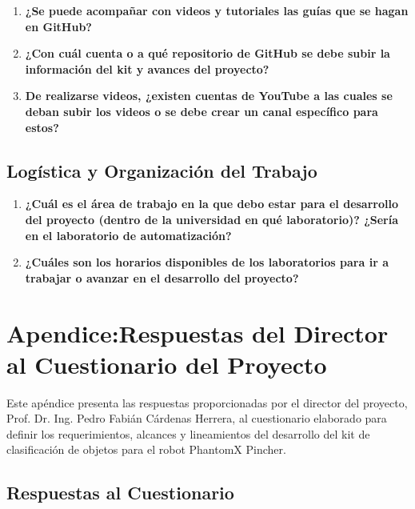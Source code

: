 \begin{enumerate}[start=15]
    \item \textbf{¿Se puede acompañar con videos y tutoriales las guías que se hagan en GitHub?}
    
    \item \textbf{¿Con cuál cuenta o a qué repositorio de GitHub se debe subir la información del kit y avances del proyecto?}
    
    \item \textbf{De realizarse videos, ¿existen cuentas de YouTube a las cuales se deban subir los videos o se debe crear un canal específico para estos?}
\end{enumerate}

\section{Logística y Organización del Trabajo}

\begin{enumerate}[start=24]
    \item \textbf{¿Cuál es el área de trabajo en la que debo estar para el desarrollo del proyecto (dentro de la universidad en qué laboratorio)? ¿Sería en el laboratorio de automatización?}
    
    \item \textbf{¿Cuáles son los horarios disponibles de los laboratorios para ir a trabajar o avanzar en el desarrollo del proyecto?}
\end{enumerate}


\chapter{Apendice:Respuestas del Director al Cuestionario del Proyecto}

Este apéndice presenta las respuestas proporcionadas por el director del proyecto, Prof. Dr. Ing. Pedro Fabián Cárdenas Herrera, al cuestionario elaborado para definir los requerimientos, alcances y lineamientos del desarrollo del kit de clasificación de objetos para el robot PhantomX Pincher.

\section{Respuestas al Cuestionario}

